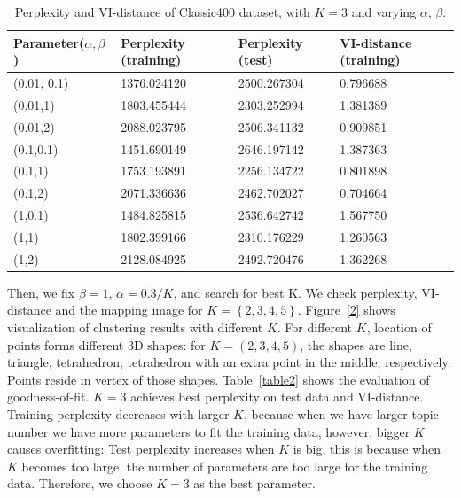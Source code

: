 \documentclass{article} %
\begin{document}
\begin{table}
\centering 
    \begin{tabular}{|l|l|l|l|}
    \hline
    Parameter($\alpha, \beta$)  & Perplexity (training) & Perplexity (test)  & VI-distance (training)  \\ \hline
    (0.01, 0.1)   & 1376.024120           & 2500.267304                                     & 0.796688               \\ \hline
    (0.01,1)      & 1803.455444           & 2303.252994                                     & 1.381389               \\ \hline
    (0.01,2)      & 2088.023795           & 2506.341132                                     & 0.909851               \\ \hline
    (0.1,0.1)     & 1451.690149           & 2646.197142                                     & 1.387363               \\ \hline
    (0.1,1)       & 1753.193891           & 2256.134722                                       & 0.801898               \\ \hline
    (0.1,2)       & 2071.336636           & 2462.702027                                       & 0.704664               \\ \hline
    (1,0.1)       & 1484.825815           & 2536.642742                                       & 1.567750               \\ \hline
    (1,1)         & 1802.399166           & 2310.176229                                       & 1.260563               \\ \hline
    (1,2)         & 2128.084925           & 2492.720476                                       & 1.362268               \\ \hline   
    \end{tabular}
     \caption{Perplexity and VI-distance of Classic400 dataset, with $K= 3$ and varying $\alpha$, $\beta$.}   
     \label{table1}
\end{table}
Then, we fix $\beta = 1$, $\alpha = 0.3/K$, and search for best K. We check perplexity, VI-distance and the mapping image for $K = \left\{2,3,4,5\right\}$. Figure~\ref{2} shows visualization of clustering results with different $K$. For different $K$, location of points forms different 3D shapes: for $K = (2,3,4,5)$, the shapes are line, triangle, tetrahedron, tetrahedron with an extra point in the middle, respectively. Points reside in vertex of those shapes. Table~\ref{table2} shows the evaluation of goodness-of-fit. $K=3$ achieves best perplexity on test data and VI-distance. Training perplexity decreases with larger $K$, because when we have larger topic number we have more parameters to fit the training data, however, bigger $K$ causes overfitting: Test perplexity increases when $K$ is big, this is because when $K$ becomes too large, the number of parameters are too large for the training data. Therefore, we choose $K = 3$ as the best parameter.
\end{document}
